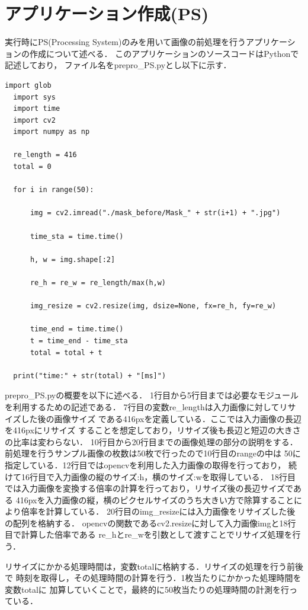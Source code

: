 \documentclass[11pt,a4j]{jreport}
\begin{document}
\section{アプリケーション作成(PS)}
実行時にPS(Processing System)のみを用いて画像の前処理を行うアプリケーションの作成について述べる．
このアプリケーションのソースコードはPythonで記述しており，
ファイル名をprepro_PS.pyとし以下に示す．
\begin{lstlisting}[caption=prepro_PS.py]
  import glob
  import sys
  import time
  import cv2
  import numpy as np
  
  re_length = 416
  total = 0
  
  for i in range(50):
  
      img = cv2.imread("./mask_before/Mask_" + str(i+1) + ".jpg")
  
      time_sta = time.time()
  
      h, w = img.shape[:2]
  
      re_h = re_w = re_length/max(h,w)
  
      img_resize = cv2.resize(img, dsize=None, fx=re_h, fy=re_w)
  
      time_end = time.time()
      t = time_end - time_sta
      total = total + t
  
  print("time:" + str(total) + "[ms]")
\end{lstlisting}
prepro_PS.pyの概要を以下に述べる．
1行目から5行目までは必要なモジュールを利用するための記述である．
7行目の変数re_lengthは入力画像に対してリサイズした後の画像サイズ
である416pxを定義している．ここでは入力画像の長辺を416pxにリサイズ
することを想定しており，リサイズ後も長辺と短辺の大きさの比率は変わらない．
10行目から20行目までの画像処理の部分の説明をする．
前処理を行うサンプル画像の枚数は50枚で行ったので10行目のrangeの中は
50に指定している．12行目ではopencvを利用した入力画像の取得を行っており，
続けて16行目で入力画像の縦のサイズ:h，横のサイズ:wを取得している．
18行目では入力画像を変換する倍率の計算を行っており，リサイズ後の長辺サイズである
416pxを入力画像の縦，横のピクセルサイズのうち大きい方で除算することにより倍率を計算している．
20行目のimg_resizeには入力画像をリサイズした後の配列を格納する．
opencvの関数であるcv2.resizeに対して入力画像imgと18行目で計算した倍率である
re_hとre_wを引数として渡すことでリサイズ処理を行う．

リサイズにかかる処理時間は，変数totalに格納する．リサイズの処理を行う前後で
時刻を取得し，その処理時間の計算を行う．1枚当たりにかかった処理時間を変数totalに
加算していくことで，最終的に50枚当たりの処理時間の計測を行っている．
\end{document}
